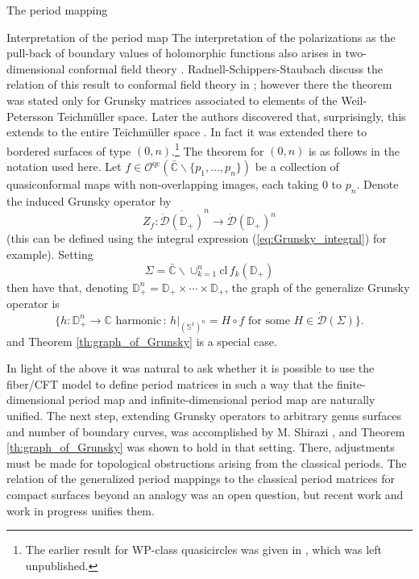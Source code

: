 \documentclass[12pt]{amsart}
\newcommand{\disk}{\ensuremath{\mathbb{D}} } %
\newcommand{\sphere}{\bar{\Bbb{C}}} %
\newcommand{\riem}{\Sigma}  %
\renewcommand{\Bbb}[1]{\ensuremath{\mathbb{#1}}}
\theoremstyle{plain}
\theoremstyle{definition}
\theoremstyle{remark}
\numberwithin{equation}{section} %
\numberwithin{figure}{section} %
\begin{document}
\begin{section}{The period mapping}
\begin{subsection}{Interpretation of the period map}
  The interpretation of the polarizations as the pull-back of boundary values of holomorphic functions also arises in two-dimensional conformal field theory \cite[Appendix D]{Huang}. 
  Radnell-Schippers-Staubach discuss the relation of this result to conformal field theory in \cite{RadnellSchippersStaubach_CFT_review}; however there the theorem was stated only for Grunsky matrices associated to elements of the Weil-Petersson Teichm\"uller space. Later the authors discovered that, surprisingly, this extends to the entire Teichm\"uller space \cite{RadnellSchippersStaubach_Grunsky_genuszero}. In fact it was extended there to bordered surfaces of type $(0,n)$.\footnote{The earlier result for WP-class quasicircles was given in \cite{RSS_WP_multiply}, which was left unpublished.} The theorem for $(0,n)$ is as follows in the notation used here. Let $f \in \mathcal{O}^{\mathrm{qc}}(\sphere \backslash \{p_1,\ldots,p_n\})$ be a collection of quasiconformal maps with non-overlapping images, each taking $0$ to $p_n$. Denote the induced Grunsky operator by 
  \[  Z_f :\overline{\dot{\mathcal{D}}(\disk_+)}^n \rightarrow   \dot{\mathcal{D}}(\disk_+)^n   \]
  (this can be defined using the integral expression (\ref{eq:Grunsky_integral}) for example). Setting 
  \[  \riem = \sphere \backslash \cup_{k=1}^n \mathrm{cl} \, f_k(\disk_+)   \]
  then have that, denoting $\mathbb{D}_+^n = \mathbb{D}_+  \times \cdots \times \mathbb{D}_+$, the graph of the generalize Grunsky operator is  
  \[  \{ h:\disk_+^n \rightarrow \mathbb{C} \text{ harmonic} \,: \, \left. h \right|_{\left(\mathbb{S}^1\right)^n} = H \circ f \text{ for some } H \in \dot{\mathcal{D}}(\riem) \}.  \]
  and Theorem \ref{th:graph_of_Grunsky} is a special case.   
  
  In light of the above it was natural to ask whether it is possible to use the fiber/CFT model to define period matrices in such a way that the finite-dimensional period map and infinite-dimensional period map are naturally unified.  The next step, extending Grunsky operators to arbitrary genus surfaces and number of boundary curves, was accomplished by M. Shirazi \cite{Shirazi_Grunsky}, and Theorem \ref{th:graph_of_Grunsky} was shown to hold in that setting. 
  There, adjustments must be made for topological obstructions arising from the classical periods.  The relation of the generalized period mappings to the classical period matrices for compact surfaces beyond an analogy was an open question, but recent work \cite{Schippers_Staubach_scattering} {and work in progress} unifies them. 


\end{subsection}
\end{section}
\end{document}
